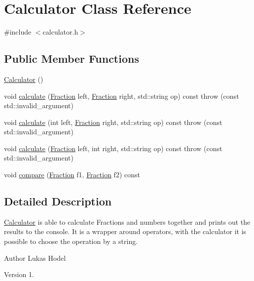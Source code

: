 \hypertarget{classCalculator}{\section{Calculator Class Reference}
\label{classCalculator}
}


{\ttfamily \#include $<$calculator.\-h$>$}

\subsection*{Public Member Functions}
\begin{DoxyCompactItemize}
\item 
\hyperlink{classCalculator_adf568b2e0dacc9adf5b7d740622beb92}{Calculator} ()
\item 
void \hyperlink{classCalculator_ad7c285bf5752406a7cb31e2d215785cc}{calculate} (\hyperlink{classFraction}{Fraction} left, \hyperlink{classFraction}{Fraction} right, std\-::string op) const   throw (const std\-::invalid\-\_\-argument)
\item 
void \hyperlink{classCalculator_aa1206e4ba90ec9b16996a7719a0b7a6b}{calculate} (int left, \hyperlink{classFraction}{Fraction} right, std\-::string op) const   throw (const std\-::invalid\-\_\-argument)
\item 
void \hyperlink{classCalculator_aab2a415730a7a9f0373bf4031fe48acc}{calculate} (\hyperlink{classFraction}{Fraction} left, int right, std\-::string op) const   throw (const std\-::invalid\-\_\-argument)
\item 
void \hyperlink{classCalculator_ab63c1adcd80233adf0c75b2fedbc9358}{compare} (\hyperlink{classFraction}{Fraction} f1, \hyperlink{classFraction}{Fraction} f2) const 
\end{DoxyCompactItemize}


\subsection{Detailed Description}
\hyperlink{classCalculator}{Calculator} is able to calculate Fractions and numbers together and prints out the results to the console. It is a wrapper around operators, with the calculator it is possible to choose the operation by a string.

\begin{DoxyAuthor}{Author}
Lukas Hodel 
\end{DoxyAuthor}
\begin{DoxyVersion}{Version}
1. 
\end{DoxyVersion}


